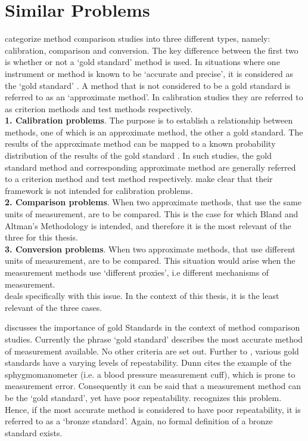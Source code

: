 \documentclass[12pt, a4paper]{report}
\theoremstyle{plain}
\theoremstyle{definition}
\theoremstyle{remark}
\begin{document}
\section{Similar Problems}
\citet{lewis1991} categorize method comparison studies into three
different types, namely: calibration, comparison and conversion. The key difference between the first two is
whether or not a `gold standard' method is used. In situations
where one instrument or method is known to be `accurate and
precise', it is considered as the `gold standard' \citep{lewis1991}. A
method that is not considered to be a gold standard is referred to
as an `approximate method'. In calibration studies they are
referred to as criterion methods and test methods respectively.\\
\smallskip
\textbf{1. Calibration problems}. The purpose is to establish a
relationship between methods, one of which is an approximate
method, the other a gold standard. The results of the approximate
method can be mapped to a known probability distribution of the
results of the gold standard \citep{lewis1991}. In such studies, the
gold standard method and corresponding approximate method are
generally referred to a criterion method and test method respectively. \citet*{BA83} make clear that their framework is
not intended for calibration problems.\\
\smallskip \textbf{2. Comparison problems}. When two approximate methods, that use the same units of measurement, are to be
compared. This is the case for which Bland and Altman's Methodology is intended, and therefore it is the most relevant of
the three for this thesis.\\
\smallskip \textbf{3. Conversion problems}. When two approximate methods, that use different units of measurement, are to be	compared. This situation would arise when the measurement methods
use `different proxies', i.e different mechanisms of measurement.\\
\smallskip
\citet{lewis1991} deals specifically with this issue. In the context
of this thesis, it is the least relevant of the three cases.

\citet{Aroy2015} discusses the importance of gold Standards in the context of method comparison studies.
Currently the phrase `gold standard' describes the most accurate method of measurement available. No other criteria are set out. Further to \citet{DunnSEME}, various gold standards have a varying levels of repeatability. Dunn cites the example of the sphygmomanometer (i.e. a blood pressure measurement cuff), which is prone to measurement error. Consequently it can be said that a measurement method can be the `gold standard', yet have poor repeatability. \citet{DunnSEME} recognizes this problem. Hence, if the most accurate method is considered to have poor repeatability, it is referred to as a `bronze standard'.  Again, no formal definition of a bronze standard exists.
\end{document}
